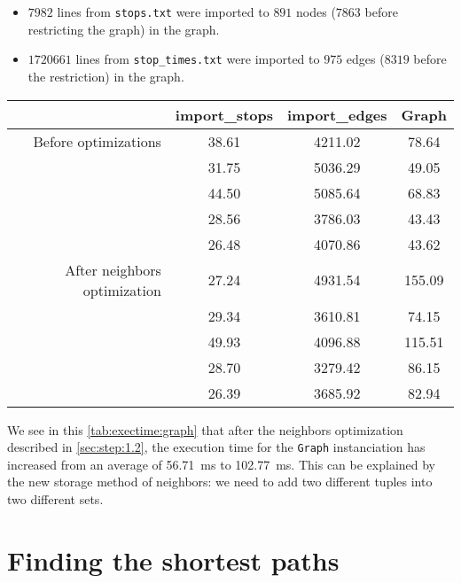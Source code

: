 \documentclass[12pt,english]{article}
\begin{document}
	\begin{itemize}
		\item \(7982\) lines from \texttt{stops.txt} were imported to \(891\) nodes (\(7863\) before restricting the graph) in the graph.
		\item \(1720661\) lines from \texttt{stop\_times.txt} were imported to \(975\) edges (\(8319\) before the restriction) in the graph.
	\end{itemize}

	\begin{center}
		\begin{tabular}{r c c c}
			& \textbf{\ttfamily import\_stops} & \textbf{\ttfamily import\_edges} & \textbf{\ttfamily Graph}\\
			\hline\hline
			Before optimizations & \num{38.61} & \num{4211.02} & \num{78.64}\\
			& \num{31.75} & \num{5036.29} & \num{49.05}\\
			& \num{44.50} & \num{5085.64} & \num{68.83}\\
			& \num{28.56} & \num{3786.03} & \num{43.43}\\
			& \num{26.48} & \num{4070.86} & \num{43.62}\\
			\hline
			After neighbors optimization & \num{27.24} & \num{4931.54} & \num{155.09}\\
			& \num{29.34} & \num{3610.81} & \num{74.15}\\
			& \num{49.93} & \num{4096.88} & \num{115.51}\\
			& \num{28.70} & \num{3279.42} & \num{86.15}\\
			& \num{26.39} & \num{3685.92} & \num{82.94}\\
		\end{tabular}
		\label{tab:exectime:graph}
	\end{center}
	We see in this \autoref{tab:exectime:graph} that after the neighbors optimization described in \autoref{sec:step:1.2}, the execution time for the \texttt{Graph} instanciation has increased from an average of \SI{56.71}{\milli\second} to \SI{102.77}{\milli\second}.
	This can be explained by the new storage method of neighbors: we need to add two different tuples into two different sets.

	\section{Finding the shortest paths}\label{sec:step:2}
\end{document}
